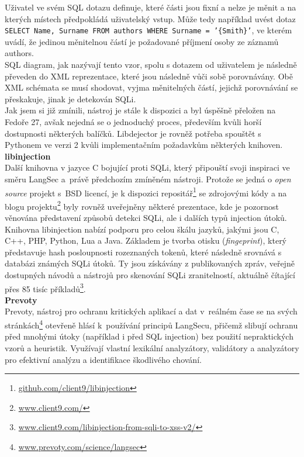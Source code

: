 Uživatel ve svém SQL dotazu definuje, které části jsou fixní a nelze je měnit a na kterých místech předpokládá uživatelský vstup.
Může tedy například uvést dotaz \texttt{SELECT Name, Surname FROM authors WHERE Surname = '\{Smith\}'}, ve kterém uvádí, že jedinou měnitelnou 
částí je požadované příjmení osoby ze záznamů authors. \\

SQL diagram, jak nazývají tento vzor, spolu s dotazem od uživatelem je následně převeden do XML reprezentace, které jsou následně vůči sobě porovnávány.
Obě XML schémata se musí shodovat, vyjma měnitelných částí, jejichž porovnávání se přeskakuje, jinak je detekován SQLi. \\

Jak jsem si již zmínili, nástroj je stále k dispozici a byl úspěšně přeložen na Fedoře 27, avšak nejedná se o jednoduchý proces, především kvůli 
horší dostupnosti některých balíčků. Libdejector je rovněž potřeba spouštět s Pythonem ve verzi 2 kvůli implementačním požadavkům některých knihoven. \\

\newpage
\Bat{} \textbf{libinjection} \\
Další knihovna v jazyce C bojující proti SQLi, který připouští svoji inspiraci ve směru \mbox{LangSec} a~právě předchozím zmíněném nástroji. Protože se jedná 
o \textit{open source} projekt s~BSD licencí, je k dispozici repositář\footnote{\url{github.com/client9/libinjection}} se zdrojovými kódy
a na blogu projektu\footnote{\url{www.client9.com/}} byly rovněž uveřejněny některé prezentace, kde je pozornost věnována představení způsobů detekci 
SQLi, ale i dalších typů injection útoků. \\

Knihovna libinjection nabízí podporu pro celou škálu jazyků, jakými jsou C, C++, PHP, Python, Lua a Java. Základem je tvorba otisku (\textit{fingeprint}),
který představuje hash posloupnosti rozeznaných tokenů, které následně srovnává s databázi známých SQLi útoků. Ty jsou získávány z publikovaných zpráv,
veřejně dostupných návodů a nástrojů pro skenování SQLi zranitelností, aktuálně čítající přes 85 tisíc 
příkladů\footnote{\url{www.client9.com/libinjection-from-sqli-to-xss-v2/}}. \\

\Bat{} \textbf{Prevoty} \\
Prevoty, nástroj pro ochranu kritických aplikací a dat v~reálném čase se na svých stránkách\footnote{\url{www.prevoty.com/science/langsec}} otevřeně 
hlásí k~používání principů LangSecu, přičemž slibují ochranu před mnohými útoky (například i před SQL injection) bez použití nepraktických vzorů 
a heuristik. Využívají vlastní lexikální analyzátory, validátory a analyzátory pro efektivní analýzu a identifikace škodlivého chování. \\

